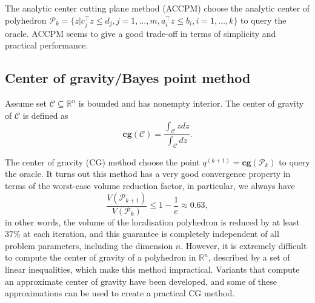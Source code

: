 \documentclass[twocolumn,a4wide,9pt]{extarticle}
\newcommand{\eat}[1]{}
\begin{document}
\eat{citation}

The analytic center cutting plane method (ACCPM) choose the analytic center of polyhedron 
$\mathcal{P}_k = \{ z | c_j^\top z \le d_j, j=1, \dots, m, a_i^\top z \le b_i, i=1, \dots, k \}$ to query the oracle.
ACCPM seems to give a good trade-off in terms of simplicity and practical performance.

\eat{citation}


\subsection{Center of gravity/Bayes point method}
Assume set $\mathcal{C} \subseteq \mathbb{R}^n$ is bounded and has nonempty interior. 
The center of gravity of $\mathcal{C}$ is defined as
\begin{equation}
\textbf{cg}(\mathcal{C}) = \frac{\int_\mathcal{C} z dz}{\int_\mathcal{C} dz}.
\end{equation}

The center of gravity (CG) method choose the point $q^{(k+1)} = \textbf{cg}(\mathcal{P}_{k})$ to query the oracle.
It turns out this method has a very good convergence property in terms of the worst-case volume reduction factor,
in particular, we always have
\begin{equation}
\frac{V(\mathcal{P}_{k+1})}{V(\mathcal{P}_{k})} \le 1 - \frac{1}{e} \approx 0.63,
\end{equation}
in other words, the volume of the localisation polyhedron is reduced by at least $37\%$ at each iteration,
and this guarantee is completely independent of all problem parameters, including the dimension $n$.
However, it is extremely difficult to compute the center of gravity of a polyhedron in $\mathbb{R}^n$, described by a set of linear inequalities,
which make this method impractical.
Variants that compute an approximate center of gravity have been developed, and some of these approximations can be used to create a practical CG method.

\eat{citation}
\end{document}
